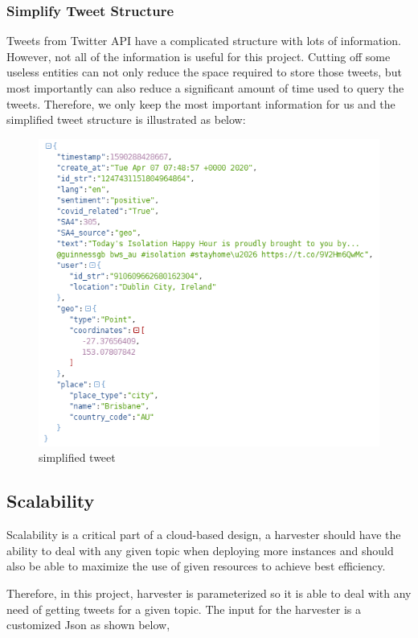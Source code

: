 \subsubsection{Simplify Tweet Structure}
Tweets from Twitter API have a complicated structure with lots of information. However, not all of the information is useful for this project. Cutting off some useless entities can not only reduce the space required to store those tweets, but most importantly can also reduce a significant amount of time used to query the tweets. Therefore, we only keep the most important information for us and the simplified tweet structure is illustrated as below:

\begin{figure}[h!]
\centering
\includegraphics[scale=0.7]{city_analytics/report/images/simplifiedtweet.png}
\caption{simplified tweet}
\label{fig:stream}
\end{figure}


\subsection{Scalability}

Scalability is a critical part of a cloud-based design, a harvester should have the ability to deal with any given topic when deploying more instances and should also be able to maximize the use of given resources to achieve best efficiency.

Therefore, in this project, harvester is parameterized so it is able to deal with any need of getting tweets for a given topic. The input for the harvester is a customized Json as shown below,

